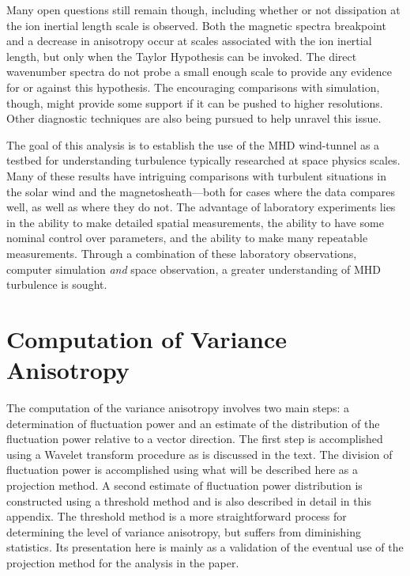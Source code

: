 \documentclass[aip,prl,amsmath,amssymb,reprint,superscriptaddress]{revtex4-1} %
\begin{document}
Many open questions still remain though, including whether or not dissipation at the ion inertial length scale is observed. Both the magnetic spectra breakpoint and a decrease in anisotropy occur at scales associated with the ion inertial length, but only when the Taylor Hypothesis can be invoked. The direct wavenumber spectra do not probe a small enough scale to provide any evidence for or against this hypothesis. The encouraging comparisons with simulation, though, might provide some support if it can be pushed to higher resolutions. Other diagnostic techniques are also being pursued to help unravel this issue.

The goal of this analysis is to establish the use of the MHD wind-tunnel as a testbed for understanding turbulence typically researched at space physics scales. Many of these results have intriguing comparisons with turbulent situations in the solar wind and the magnetosheath---both for cases where the data compares well, as well as where they do not. The advantage of laboratory experiments lies in the ability to make detailed spatial measurements, the ability to have some nominal control over parameters, and the ability to make many repeatable measurements. Through a combination of these laboratory observations, computer simulation {\it and} space observation, a greater understanding of MHD turbulence is sought.

\appendix

\section{Computation of Variance Anisotropy}\label{sec:projection}

The computation of the variance anisotropy involves two main steps: a determination of fluctuation power and an estimate of the distribution of the fluctuation power relative to a vector direction. The first step is accomplished using a Wavelet transform procedure as is discussed in the text. The division of fluctuation power is accomplished using what will be described here as a projection method. A second estimate of fluctuation power distribution is constructed using a threshold method and is also described in detail in this appendix. The threshold method is a more straightforward process for determining the level of variance anisotropy, but suffers from diminishing statistics. Its presentation here is mainly as a validation of the eventual use of the projection method for the analysis in the paper. 
\end{document}
